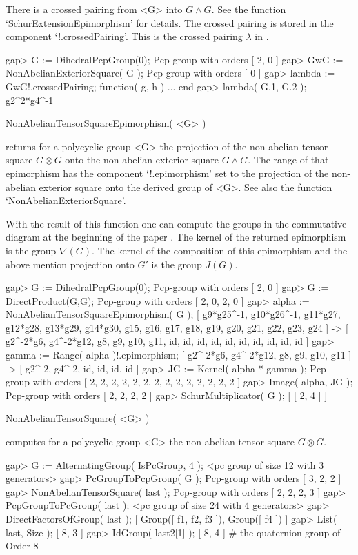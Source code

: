 There  is  a crossed  pairing  from <G>  into  $G\wedge  G$.  See  the
function `SchurExtensionEpimorphism' for details.  The crossed pairing
is stored  in the component  `!.crossedPairing'.  This is  the crossed
pairing $\lambda$ in \cite{EickNickel07}.

\beginexample
gap> G := DihedralPcpGroup(0);
Pcp-group with orders [ 2, 0 ]
gap> GwG := NonAbelianExteriorSquare( G );
Pcp-group with orders [ 0 ]
gap> lambda := GwG!.crossedPairing;
function( g, h ) ... end
gap> lambda( G.1, G.2 );
g2^2*g4^-1
\endexample

\>NonAbelianTensorSquareEpimorphism( <G> )

returns for a  polycyclic group <G> the projection  of the non-abelian
tensor  square  $G\otimes  G$  onto the  non-abelian  exterior  square
$G\wedge  G$.   The  range  of  that  epimorphism  has  the  component
`!.epimorphism'  set to  the  projection of  the non-abelian  exterior
square  onto  the  derived  group  of  <G>.   See  also  the  function
`NonAbelianExteriorSquare'.

With the  result of this  function one can  compute the groups  in the
commutative diagram at the beginning of the paper \cite{EickNickel07}.
The kernel of  the returned epimorphism is the  group $\nabla(G)$. The
kernel of  the composition of  this epimorphism and the  above mention
projection onto $G'$ is the group $J(G)$.

\beginexample
gap> G := DihedralPcpGroup(0);
Pcp-group with orders [ 2, 0 ]
gap> G := DirectProduct(G,G);
Pcp-group with orders [ 2, 0, 2, 0 ]
gap> alpha := NonAbelianTensorSquareEpimorphism( G );
[ g9*g25^-1, g10*g26^-1, g11*g27, g12*g28, g13*g29, g14*g30, g15, g16,
g17,
  g18, g19, g20, g21, g22, g23, g24 ] -> [ g2^-2*g6, g4^-2*g12, g8,
  g9, g10,
  g11, id, id, id, id, id, id, id, id, id, id ]
gap> gamma := Range( alpha )!.epimorphism;
[ g2^-2*g6, g4^-2*g12, g8, g9, g10, g11 ] -> [ g2^-2, g4^-2, id, id,
id, id ]
gap> JG := Kernel( alpha * gamma );
Pcp-group with orders [ 2, 2, 2, 2, 2, 2, 2, 2, 2, 2, 2, 2, 2, 2 ]
gap> Image( alpha, JG );
Pcp-group with orders [ 2, 2, 2, 2 ]
gap> SchurMultiplicator( G );
[ [ 2, 4 ] ]

\>NonAbelianTensorSquare( <G> )

computes  for a  polycyclic group  <G> the  non-abelian  tensor square
$G\otimes G$.

\beginexample
gap> G := AlternatingGroup( IsPcGroup, 4 );
<pc group of size 12 with 3 generators>
gap> PcGroupToPcpGroup( G );
Pcp-group with orders [ 3, 2, 2 ]
gap> NonAbelianTensorSquare( last );
Pcp-group with orders [ 2, 2, 2, 3 ]
gap> PcpGroupToPcGroup( last );
<pc group of size 24 with 4 generators>
gap> DirectFactorsOfGroup( last );
[ Group([ f1, f2, f3 ]), Group([ f4 ]) ]
gap> List( last, Size );
[ 8, 3 ]
gap> IdGroup( last2[1] );
[ 8, 4 ]       # the quaternion group of Order 8


